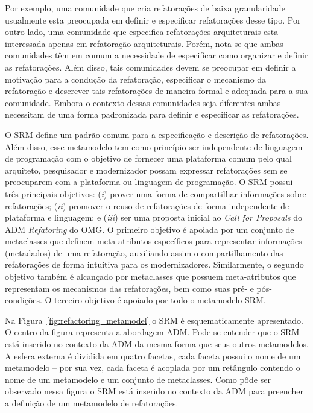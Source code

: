 Por exemplo, uma comunidade que cria refatorações de baixa granularidade usualmente esta preocupada em definir e especificar refatorações desse tipo. Por outro lado, uma comunidade que especifica refatorações arquiteturais esta interessada apenas em refatoração arquiteturais. Porém, nota-se que ambas comunidades têm em comum a necessidade de especificar como organizar e definir as refatorações. Além disso, tais comunidades devem se preocupar em definir a motivação para a condução da refatoração, especificar o mecanismo da refatoração e descrever tais refatorações de maneira formal e adequada para a sua comunidade. Embora o contexto dessas comunidades seja diferentes ambas necessitam de uma forma padronizada para definir e especificar as refatorações. 


O SRM define um padrão comum para a especificação e descrição de refatorações. Além disso, esse metamodelo tem como princípio ser independente de linguagem de programação com o objetivo de fornecer uma plataforma comum pelo qual arquiteto, pesquisador e modernizador possam expressar refatorações sem se preocuparem com a plataforma ou linguagem de programação. O SRM possui três principais objetivos: (\textit{i}) prover uma forma de compartilhar informações sobre refatorações; (\textit{ii}) promover o reuso de refatorações de forma independente de plataforma e linguagem; e (\textit{iii}) ser uma proposta inicial ao \textit{Call for Proposals} do ADM \textit{Refatoring} do OMG. O primeiro objetivo é apoiada por um conjunto de metaclasses que definem meta-atributos específicos para representar informações (metadados) de uma refatoração, auxiliando assim o compartilhamento das refatorações de forma intuitiva para os modernizadores. Similarmente, o segundo objetivo também é alcançado por metaclasses que possuem meta-atributos que representam os mecanismos das refatorações, bem como suas pré- e pós-condições. O terceiro objetivo é apoiado por todo o metamodelo SRM.
 
Na Figura~\ref{fig:refactoring_metamodel} o SRM é esquematicamente apresentado. O centro da figura representa a abordagem ADM. Pode-se entender que o SRM está inserido no contexto da ADM da mesma forma que seus outros metamodelos. A esfera externa é dividida em quatro facetas, cada faceta possui o nome de um metamodelo – por sua vez, cada faceta é acoplada por um retângulo contendo o nome de um metamodelo e um conjunto de metaclasses. Como pôde ser observado nessa figura o SRM está inserido no contexto da ADM para preencher a definição de um metamodelo de refatorações. 

